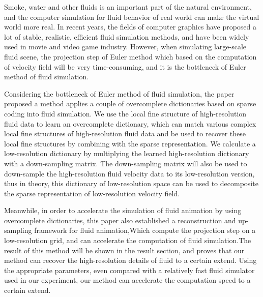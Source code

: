 \begin{englishabstract}

Smoke, water and other fluids is an important part of the natural environment, and the computer simulation for fluid behavior of real world can make the virtual world more real. In recent years, the fields of computer graphics have proposed a lot of stable, realistic, efficient fluid simulation methods, and have been widely used in movie and video game industry. However,  when simulating large-scale fluid scene, the projection step of Euler method which based on the computation of velocity field will be very time-consuming, and it is the bottleneck of Euler method of fluid simulation. 

Considering the bottleneck of Euler method of fluid simulation, the paper proposed a method applies a couple of overcomplete dictionaries based on sparse coding into fluid simulation. We use the local fine structure of high-resolution fluid data to learn an overcomplete dictionary, which can match various complex local fine structures of high-resolution fluid data and be used to recover these local fine structures by combining with the sparse representation. We calculate a low-resolution dictionary by multiplying the learned high-resolution dictionary with a down-sampling matrix. The down-sampling matrix will also be used to down-sample the high-resolution fluid velocity data to its low-resolution version, thus in theory, this dictionary of low-resolution space can be used to decomposite the sparse representation of low-resolution velocity field.

Meanwhile, in order to accelerate the simulation of fluid animation by using overcomplete dictionaries, this paper also established a reconstruction and up-sampling framework for fluid animation,Which compute the projection step on a low-resolution grid, and can accelerate the computation of fluid simulation.The result of this method will be shown in the result section, and proves that our method can recover the high-resolution details of fluid to a certain extend. Using the appropriate parameters, even compared with a relatively fast fluid simulator used in our experiment, our method can accelerate the computation speed to a certain extend.

\end{englishabstract}
